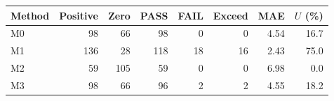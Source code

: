 \begin{tabular}{lrrrrrrr}
\toprule
Method & Positive & Zero & PASS & FAIL & Exceed & MAE & $U$ (\%) \\
\midrule
M0 & 98 & 66 & 98 & 0 & 0 & 4.54 & 16.7 \\
M1 & 136 & 28 & 118 & 18 & 16 & 2.43 & 75.0 \\
M2 & 59 & 105 & 59 & 0 & 0 & 6.98 & 0.0 \\
M3 & 98 & 66 & 96 & 2 & 2 & 4.55 & 18.2 \\
\bottomrule
\end{tabular}
